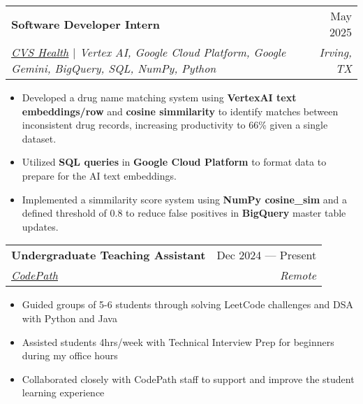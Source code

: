 \documentclass[letterpaper,11pt]{article}
\makeatletter
\newcommand{\resumeItem}[1]{
  \item\small{
    {#1 \vspace{-2pt}}
  }
}
\newcommand{\resumeSubheading}[4]{
  \vspace{-2pt}\item
    \begin{tabular*}{0.97\textwidth}[t]{l@{\extracolsep{\fill}}r}
      \textbf{#1} & #2 \\
      \textit{\small#3} & \textit{\small #4} \\
    \end{tabular*}\vspace{-7pt}
}
\newcommand{\resumeItemListStart}{\begin{itemize}}
\newcommand{\resumeItemListEnd}{\end{itemize}\vspace{-5pt}}
\makeatother
\begin{document}
    \resumeSubheading
      {Software Developer Intern}{May 2025}
      {\href{https://www.cvshealth.com/}{\underline{CVS Health}} $|$ \textit{Vertex AI}, \textit{Google Cloud Platform}, \textit{Google Gemini}, \textit{BigQuery}, \textit{SQL}, \textit{NumPy}, \textit{Python}}{Irving, TX}
      \resumeItemListStart
        \resumeItem{Developed a drug name matching system using {\textbf{VertexAI text embeddings/row}} and {\textbf{cosine simmilarity}} to identify matches between inconsistent drug records, increasing productivity to 66\% given a single dataset.}
        \resumeItem{Utilized {\textbf{SQL queries}} in {\textbf{Google Cloud Platform}} to format data to prepare for the AI text embeddings.}
        \resumeItem{Implemented a simmilarity score system using {\textbf{NumPy cosine\_sim}} and a defined threshold of 0.8 to reduce false positives in {\textbf{BigQuery}} master table updates.}
        
    \resumeItemListEnd

    \resumeSubheading
      {Undergraduate Teaching Assistant}{Dec 2024 — Present}
      {\href{https://www.codepath.org/}{\underline{CodePath}}}{Remote}
      \resumeItemListStart
        \resumeItem{Guided groups of 5-6 students through solving LeetCode challenges and DSA with Python and Java}
        \resumeItem{Assisted students 4hrs/week with Technical Interview Prep for beginners during my office hours}
        \resumeItem{Collaborated closely with CodePath staff to support and improve the student learning experience}
      \resumeItemListEnd


\end{document}
